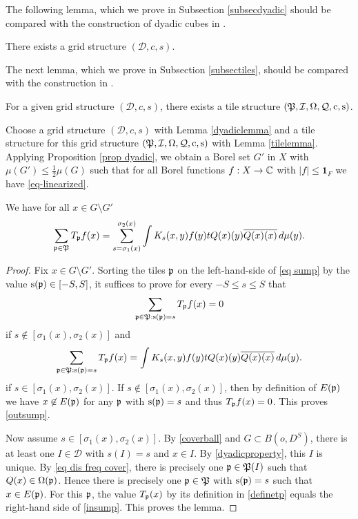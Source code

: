 The following lemma, which we prove in Subsection \ref{subsecdyadic}
should be compared with the construction of dyadic cubes in \cite[\S 3]{christ1990b}.

\begin{lemma}\label{dyadiclemma}
    There exists a grid structure $(\mathcal{D}, c,s)$.
\end{lemma}




The next lemma, which we prove in Subsection \ref{subsectiles}, should be compared
with the construction in \cite[Lemma 2.12]{zk-polynomial}.

\begin{lemma}\label{tilelemma}
    For a given grid structure $(\mathcal{D}, c,s)$, there exists a tile structure
    $(\mathfrak P,\mathcal{I},\Omega,\mathcal{Q},\mathrm{c},\mathrm{s})$.
\end{lemma}

Choose a grid structure $(\mathcal{D}, c,s)$ with Lemma \ref{dyadiclemma} and a tile structure for this
grid structure $(\mathfrak P,\mathcal{I},\Omega,\mathcal{Q},\mathrm{c},\mathrm{s})$ with Lemma \ref{tilelemma}.
Applying Proposition \ref{prop dyadic}, we obtain a Borel set $G'$ in $X$ with $\mu(G')\leq \frac 12 \mu(G)$ such that for all Borel functions $f:X\to \mathbb{C}$ with $|f|\le \mathbf{1}_F$
we have \eqref{eq-linearized}.

\begin{lemma} \label{lemmasump}
We have for all $x\in G\setminus G'$
\begin{equation}\label{eq sump}
    \sum_{\mathfrak p\in \mathfrak P}T_{\mathfrak p} f(x)= \sum_{s=\sigma_1(x)}^{\sigma_2(x)}
    \int   K_{s}(x,y) f(y) tQ(x)(y)\overline{{Q}(x)(x)}\, d\mu(y).
\end{equation}
\end{lemma}
\begin{proof}
Fix $x\in G\setminus G'$.
Sorting the tiles $\mathfrak p$ on the left-hand-side of \eqref{eq sump} by the value $\mathrm{s}(\mathfrak p)\in [-S,S]$,
it suffices to prove  for every $-S\le s\le S$ that
\begin{equation}\label{outsump}
    \sum_{\mathfrak p\in \mathfrak P: \mathrm{s}(\mathfrak p)=s}T_{\mathfrak p} f(x)=0
\end{equation}
 if $s\not\in [\sigma_1(x), \sigma_2(x)]$ and
\begin{equation}\label{insump}
    \sum_{\mathfrak p\in \mathfrak P: \mathrm{s}(\mathfrak p)=s}T_{\mathfrak p} f(x)=
    \int   K_{s}(x,y) f(y) tQ(x)(y)\overline{{Q}(x)(x)}\, d\mu(y).
\end{equation}
if $s\in [\sigma_1(x),\sigma_2(x)]$.
If $s\not\in [\sigma_1(x), \sigma_2(x)]$, then by definition of $E(\mathfrak p)$ we have
$x\not\in E(\mathfrak p)$ for any $\mathfrak p$ with $\mathrm{s}(\mathfrak p)=s$ and thus $T_{\mathfrak p} f(x)=0$. This proves
\eqref{outsump}.

Now assume $s\in [\sigma_1(x),\sigma_2(x)]$.
By \eqref{coverball} and $G\subset B(o,D^S)$, there is at least
one $I\in \mathcal{D}$ with $s(I)=s$ and $x\in I$.
By \eqref{dyadicproperty}, this $I$ is unique. By \eqref{eq dis freq cover}, there is precisely one $\mathfrak p\in \mathfrak P(I)$ such that
${Q}(x)\in \Omega(\mathfrak p)$. Hence there is precisely one  $\mathfrak p\in \mathfrak P$ with  $\mathrm{s}(\mathfrak p)=s$ such that
$x\in E(\mathfrak p)$. For this $\mathfrak p$, the value $T_{\mathfrak p}(x)$ by its definition in \eqref{definetp}
equals the right-hand side of \eqref{insump}. This proves the lemma.
\end{proof}

